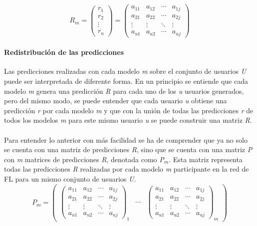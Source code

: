 \[  \textit{R$_{m}$} = 
    \begin{pmatrix}
        \textit{r$_{1}$}  \\ 
        \textit{r$_{2}$}  \\ 
        \vdots  \\ 
        \textit{r$_{u}$}
    \end{pmatrix} 
    =
    \begin{pmatrix}
        a_{11}  &  a_{12}  &  \cdots   & a_{1j} \\ 
        a_{21}  &  a_{22}  &  \cdots   & a_{2j}\\ 
        \vdots  &  \vdots  &  \ddots & \vdots  \\ 
        a_{u1}  &  a_{u2}  &  \cdots   & a_{uj}
    \end{pmatrix}
\]
\newpage
\paragraph{Redistribución de las predicciones}
Las predicciones realizadas con cada modelo \textit{m} sobre el conjunto de usuarios \textit{U} puede ser interpretada de diferente forma. En un principio se entiende que cada modelo \textit{m} genera una predicción \textit{R} para cada uno de los \textit{u} usuarios generados, pero del mismo modo, se puede entender que cada usuario \textit{u} obtiene una predicción \textit{r} por cada modelo \textit{m} y que con la unión de todas las predicciones \textit{r} de todos los modelos \textit{m} para este mismo usuario \textit{u} se puede construir una matriz \textit{R}. 
\\ \\
Para entender lo anterior con más facilidad se ha de comprender que ya no solo se cuenta con una matriz de predicciones \textit{R}, sino que se cuenta con una matriz \textit{P} con \textit{m} matrices de predicciones \textit{R}, denotada como \textit{P$_{m}$}. Esta matriz representa todas las predicciones \textit{R} realizadas por cada modelo \textit{m} participante en la red de FL para un mismo conjunto de usuarios \textit{U}.
\[
    \textit{P$_{m}$}=
    \begin{pmatrix}
        \begin{pmatrix}
            a_{11}  &  a_{12}  &  \cdots   & a_{1j} \\ 
            a_{21}  &  a_{22}  &  \cdots   & a_{2j}\\ 
            \vdots  &  \vdots  &  \ddots & \vdots  \\ 
            a_{u1}  &  a_{u2}  &  \cdots   & a_{uj}
        \end{pmatrix}_{\textit{1}}
        & 
        \cdots 
        &
        \begin{pmatrix}
            a_{11}  &  a_{12}  &  \cdots   & a_{1j} \\ 
            a_{21}  &  a_{22}  &  \cdots   & a_{2j}\\ 
            \vdots  &  \vdots  &  \ddots & \vdots  \\ 
            a_{u1}  &  a_{u2}  &  \cdots   & a_{uj}
        \end{pmatrix}_{\textit{m}}
    \end{pmatrix}
\]
